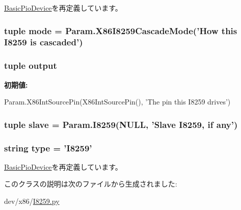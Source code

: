 \hyperlink{classDevice_1_1BasicPioDevice_a17da7064bc5c518791f0c891eff05fda}{BasicPioDevice}を再定義しています。\hypertarget{classI8259_1_1I8259_a2d32e91794d9088c7fe3e55f1a699012}{
\subsubsection[{mode}]{\setlength{\rightskip}{0pt plus 5cm}tuple {\bf mode} = Param.X86I8259CascadeMode('How this {\bf I8259} is cascaded')}}
\label{classI8259_1_1I8259_a2d32e91794d9088c7fe3e55f1a699012}
\hypertarget{classI8259_1_1I8259_acf316e258896197f4e917a6547e49532}{
\subsubsection[{output}]{\setlength{\rightskip}{0pt plus 5cm}tuple {\bf output}}}
\label{classI8259_1_1I8259_acf316e258896197f4e917a6547e49532}
{\bfseries 初期値:}
\begin{DoxyCode}
Param.X86IntSourcePin(X86IntSourcePin(),
            'The pin this I8259 drives')
\end{DoxyCode}
\hypertarget{classI8259_1_1I8259_a9b8cb1f697e86858437a78f041478c9b}{
\subsubsection[{slave}]{\setlength{\rightskip}{0pt plus 5cm}tuple {\bf slave} = Param.I8259(NULL, 'Slave {\bf I8259}, if any')}}
\label{classI8259_1_1I8259_a9b8cb1f697e86858437a78f041478c9b}
\hypertarget{classI8259_1_1I8259_acce15679d830831b0bbe8ebc2a60b2ca}{
\subsubsection[{type}]{\setlength{\rightskip}{0pt plus 5cm}string {\bf type} = '{\bf I8259}'}}
\label{classI8259_1_1I8259_acce15679d830831b0bbe8ebc2a60b2ca}


\hyperlink{classDevice_1_1BasicPioDevice_acce15679d830831b0bbe8ebc2a60b2ca}{BasicPioDevice}を再定義しています。

このクラスの説明は次のファイルから生成されました:\begin{DoxyCompactItemize}
\item 
dev/x86/\hyperlink{I8259_8py}{I8259.py}\end{DoxyCompactItemize}
